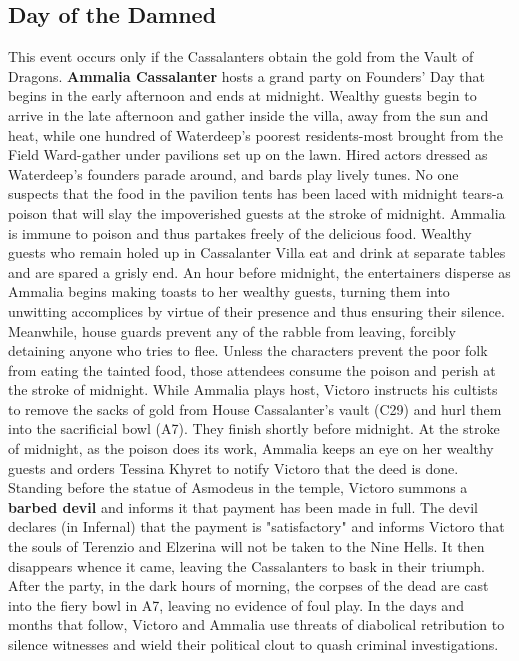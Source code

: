 \documentclass[10pt,a4paper,twoside,twocolumn,openany,nodeprecatedcode]{dndbook}
\begin{document}
\subsection{Day of the Damned}
This event occurs only if the Cassalanters obtain the gold from the Vault of Dragons.
\textbf{Ammalia Cassalanter} hosts a grand party on Founders' Day that begins in the early afternoon and ends at midnight. Wealthy guests begin to arrive in the late afternoon and gather inside the villa, away from the sun and heat, while one hundred of Waterdeep's poorest residents-most brought from the Field Ward-gather under pavilions set up on the lawn. Hired actors dressed as Waterdeep's founders parade around, and bards play lively tunes. No one suspects that the food in the pavilion tents has been laced with midnight tears-a poison that will slay the impoverished guests at the stroke of midnight. Ammalia is immune to poison and thus partakes freely of the delicious food. Wealthy guests who remain holed up in Cassalanter Villa eat and drink at separate tables and are spared a grisly end.
An hour before midnight, the entertainers disperse as Ammalia begins making toasts to her wealthy guests, turning them into unwitting accomplices by virtue of their presence and thus ensuring their silence. Meanwhile, house guards prevent any of the rabble from leaving, forcibly detaining anyone who tries to flee. Unless the characters prevent the poor folk from eating the tainted food, those attendees consume the poison and perish at the stroke of midnight.
While Ammalia plays host, Victoro instructs his cultists to remove the sacks of gold from House Cassalanter's vault (C29) and hurl them into the sacrificial bowl (A7). They finish shortly before midnight. At the stroke of midnight, as the poison does its work, Ammalia keeps an eye on her wealthy guests and orders Tessina Khyret to notify Victoro that the deed is done. Standing before the statue of Asmodeus in the temple, Victoro summons a \textbf{barbed devil} and informs it that payment has been made in full. The devil declares (in Infernal) that the payment is "satisfactory" and informs Victoro that the souls of Terenzio and Elzerina will not be taken to the Nine Hells. It then disappears whence it came, leaving the Cassalanters to bask in their triumph.
After the party, in the dark hours of morning, the corpses of the dead are cast into the fiery bowl in A7, leaving no evidence of foul play. In the days and months that follow, Victoro and Ammalia use threats of diabolical retribution to silence witnesses and wield their political clout to quash criminal investigations.
\end{document}
